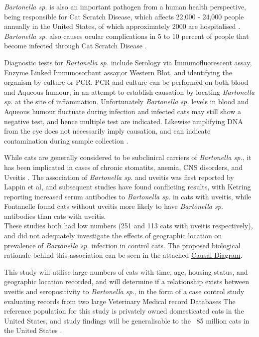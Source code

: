 \documentclass[11pt,twocolumn]{article}
\begin{document}
		\emph{Bartonella sp.} is also an important pathogen from a human health perspective, being responsible for Cat Scratch Disease, which affects 22,000 - 24,000 people annually in the United States, of which approximately 2000 are hospitalised \cite{Jackson1993}.
		\emph{Bartonella sp.} also causes ocular complications in 5 to 10 percent of people that become infected through Cat Scratch Disease \cite{Wade2000}.
	
		Diagnostic tests for \emph{Bartonella sp.} include Serology via Immunofluorescent assay, Enzyme Linked Immunosorbant assay,or Western Blot, and identifying the organism by culture or PCR.
		PCR and culture can be performed on both blood and Aqueous humour, in an attempt to establish causation by locating \emph{Bartonella sp.} at the site of inflammation. Unfortunately \emph{Bartonella sp.} levels in blood and Aqueous humour fluctuate during infection and infected cats may still show a negative test, and hence multiple test are indicated\cite{Guptill2010}. Likewise amplifying DNA from the eye does not necessarily imply causation, and can indicate contamination during sample collection \cite{Powell2010}.


		While cats are generally considered to be subclinical carriers of \emph{Bartonella sp.}, it has been implicated in cases of chronic stomatits, anemia, CNS disorders, and Uveitis \cite{Nasir2005}.
		The association of \emph{Bartonella sp.} and uveitis was first reported by Lappin et al\cite{Lappin1999}, and subsequent studies have found conflicting results, with Ketring reporting increased serum antibodies to \emph{Bartonella sp.} in cats with uveitis\cite{Ketring2004}, while Fontanelle found cats without uveitis more likely to have \emph{Bartonella sp.} antibodies than cats with uveitis.\\
		These studies both had low numbers (251 and 113 cats with uveitis respectively), and did not adequately investigate the effects of geographic location on prevalence of \emph{Bartonella sp.} infection in control cats.
		The proposed biological rationale behind this association can be seen in the attached \hyperref[fig:causal]{Causal Diagram}.
	
		This study will utilise large numbers of cats with time, age, housing status, and geographic location recorded, and will determine if a relationship exists between uveitis and seropositivity to  \emph{Bartonella sp.}, in the form of a case control study evaluating records from two large Veterinary Medical record Databases \cite{bark12,UniversityVeterinary}	
		The reference population for this study is privately owned domesticated cats in the United States, and study findings will be generalisable to the ~85 million cats in the United States \cite{HSUSown}.
		
\end{document}
